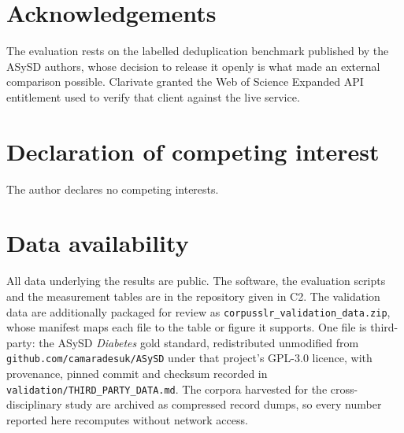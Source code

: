 \documentclass[final,5p,times,twocolumn]{elsarticle}
\begin{document}
\section*{Acknowledgements}

The evaluation rests on the labelled deduplication benchmark published by
the ASySD authors, whose decision to release it openly is what made an
external comparison possible. Clarivate granted the Web of Science
Expanded API entitlement used to verify that client against the live
service.

\section*{Declaration of competing interest}

The author declares no competing interests.

\section*{Data availability}

All data underlying the results are public. The software, the evaluation
scripts and the measurement tables are in the repository given in C2. The
validation data are additionally packaged for review as
\texttt{corpusslr\_validation\_data.zip}, whose manifest maps each file to the
table or figure it supports. One file is third-party: the ASySD \emph{Diabetes}
gold standard, redistributed unmodified from
\texttt{github.com/camaradesuk/ASySD} under that project's GPL-3.0 licence,
with provenance, pinned commit and checksum recorded in
\texttt{validation/THIRD\_PARTY\_DATA.md}. The corpora harvested for the
cross-disciplinary study are archived as compressed record dumps, so every
number reported here recomputes without network access.



\end{document}
